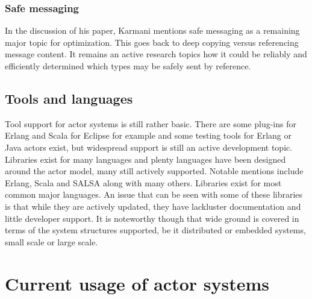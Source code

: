 \documentclass[A4]{article}
\begin{document}
\subsubsection{Safe messaging}
In the discussion of his paper, Karmani mentions safe messaging as a remaining major topic for optimization. This goes back to deep copying versus referencing message content. It remains an active research topics how it could be reliably and efficiently determined which types may be safely sent by reference.\cite[p.~10]{conf/pppj/KarmaniSA09}

\subsection{Tools and languages}
Tool support for actor systems is still rather basic. There are some plug-ins for Erlang and Scala for Eclipse for example and some testing tools for Erlang or Java actors exist, but widespread support is still an active development topic. \cite[p.~10]{reference/parallel/KarmaniA11}
Libraries exist for many languages and plenty languages have been designed around the actor model, many still actively supported. Notable mentions include Erlang, Scala and SALSA along with many others. Libraries exist for most common major languages. An issue that can be seen with some of these libraries is that while they are actively updated, they have lackluster documentation and little developer support. It is noteworthy though that wide ground is covered in terms of the system structures supported, be it distributed or embedded systems, small scale or large scale. \cite{WikiLang}

\section{Current usage of actor systems}
\end{document}
